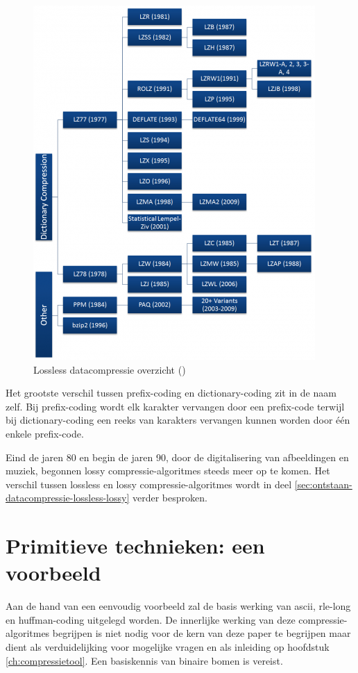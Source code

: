 \begin{figure}
	\includegraphics{img/literatuurstudie/lossles_datacompressie_overzicht.png}
	\caption{Lossless datacompressie overzicht (\cite{ethwcompressionhistory})}
	\label{fig:lossles-datacompressie-overzicht}
\end{figure}

Het grootste verschil tussen \gls{prefix-coding} en \gls{dictionary-coding} zit in de naam zelf. Bij \gls{prefix-coding} wordt elk karakter vervangen door een \gls{prefix-code} terwijl bij \gls{dictionary-coding} een reeks van karakters vervangen kunnen worden door één enkele \gls{prefix-code}.  

Eind de jaren 80 en begin de jaren 90, door de digitalisering van afbeeldingen en muziek, begonnen \gls{lossy} \glspl{compressie-algoritme} steeds meer op te komen. Het verschil tussen \gls{lossless} en \gls{lossy} \glspl{compressie-algoritme} wordt in deel \ref{sec:ontstaan-datacompressie-lossless-lossy} verder besproken.


\section{Primitieve technieken: een voorbeeld}
\label{sec:primitieve-technieken-voorbeeld}
Aan de hand van een eenvoudig voorbeeld zal de basis werking van \gls{ascii}, \gls{rle-long} en \gls{huffman-coding} uitgelegd worden. De innerlijke werking van deze \glspl{compressie-algoritme} begrijpen is niet nodig voor de kern van deze paper te begrijpen maar dient als verduidelijking voor mogelijke vragen en als inleiding op hoofdstuk \ref{ch:compressietool}. Een basiskennis van binaire bomen is vereist.

